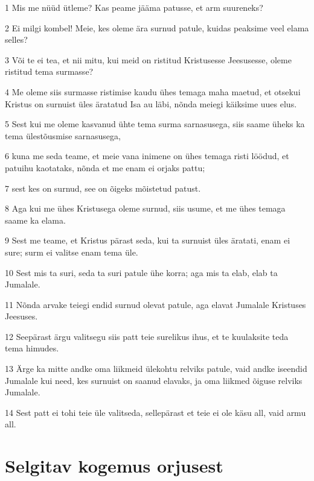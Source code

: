 \par 1 Mis me nüüd ütleme? Kas peame jääma patusse, et arm suureneks?
\par 2 Ei milgi kombel! Meie, kes oleme ära surnud patule, kuidas peaksime veel elama selles?
\par 3 Või te ei tea, et nii mitu, kui meid on ristitud Kristusesse Jeesusesse, oleme ristitud tema surmasse?
\par 4 Me oleme siis surmasse ristimise kaudu ühes temaga maha maetud, et otsekui Kristus on surnuist üles äratatud Isa au läbi, nõnda meiegi käiksime uues elus.
\par 5 Sest kui me oleme kasvanud ühte tema surma sarnasusega, siis saame üheks ka tema ülestõusmise sarnasusega,
\par 6 kuna me seda teame, et meie vana inimene on ühes temaga risti löödud, et patuihu kaotataks, nõnda et me enam ei orjaks pattu;
\par 7 sest kes on surnud, see on õigeks mõistetud patust.
\par 8 Aga kui me ühes Kristusega oleme surnud, siis usume, et me ühes temaga saame ka elama.
\par 9 Sest me teame, et Kristus pärast seda, kui ta surnuist üles äratati, enam ei sure; surm ei valitse enam tema üle.
\par 10 Sest mis ta suri, seda ta suri patule ühe korra; aga mis ta elab, elab ta Jumalale.
\par 11 Nõnda arvake teiegi endid surnud olevat patule, aga elavat Jumalale Kristuses Jeesuses.
\par 12 Seepärast ärgu valitsegu siis patt teie surelikus ihus, et te kuulaksite teda tema himudes.
\par 13 Ärge ka mitte andke oma liikmeid ülekohtu relviks patule, vaid andke iseendid Jumalale kui need, kes surnuist on saanud elavaks, ja oma liikmed õiguse relviks Jumalale.
\par 14 Sest patt ei tohi teie üle valitseda, sellepärast et teie ei ole käsu all, vaid armu all.

\section*{Selgitav kogemus orjusest}

